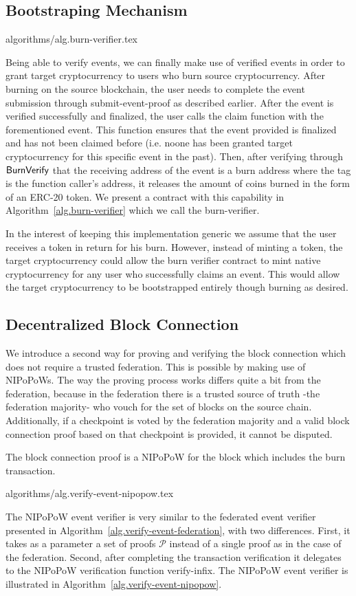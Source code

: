 \subsection{Bootstraping Mechanism}
{algorithms/alg.burn-verifier.tex}

Being able to verify events, we can finally make use of verified events in order to grant target cryptocurrency to users who burn source cryptocurrency. After burning on the source blockchain, the user needs to complete the event submission through \textsf{submit-event-proof} as described earlier. After the event is verified successfully and finalized, the user calls the \textsf{claim} function with the forementioned event. This function ensures that the event provided is finalized and has not been claimed before (i.e. noone has been granted target cryptocurrency for this specific event in the past). Then, after verifying through $\mathsf{BurnVerify}$ that the receiving address of the event is a burn address where the tag is the function caller's address, it releases the amount of coins burned in the form of an ERC-20 token. We present a contract with this capability in Algorithm~\ref{alg.burn-verifier} which we call the \textsf{burn-verifier}.

In the interest of keeping this implementation generic we assume that the user receives a token in return for his burn. However, instead of minting a token, the target cryptocurrency could allow the burn verifier contract to mint native cryptocurrency for any user who successfully claims an event. This would allow the target cryptocurrency to be bootstrapped entirely though burning as desired.

\subsection{Decentralized Block Connection}
We introduce a second way for proving and verifying the block connection which does not require a trusted federation. This is possible by making use of NIPoPoWs. The way the proving process works differs quite a bit from the federation, because in the federation there is a trusted source of truth -the federation majority- who vouch for the set of blocks on the source chain. Additionally, if a checkpoint is voted by the federation majority and a valid block connection proof based on that checkpoint is provided, it cannot be disputed.

The block connection proof is a NIPoPoW for the block which includes the burn transaction.

{algorithms/alg.verify-event-nipopow.tex}

The NIPoPoW event verifier is very similar to the federated event verifier presented in Algorithm~\ref{alg.verify-event-federation}, with two differences. First, it takes as a parameter a set of proofs $\mathcal{P}$ instead of a single proof as in the case of the federation. Second, after completing the transaction verification it delegates to the NIPoPoW verification function \textsf{verify-infix}. The NIPoPoW event verifier is illustrated in Algorithm~\ref{alg.verify-event-nipopow}.
